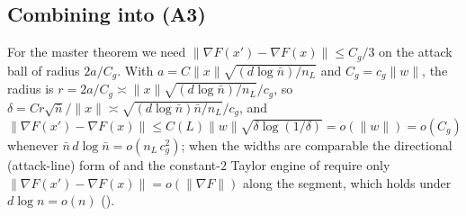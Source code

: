 \subsection{Combining into (A3)}
For the master theorem we need $\|\nabla F(x')-\nabla F(x)\|\le C_g/3$ on the attack ball of radius
$2a/C_g$. With $a=C\|x\|\sqrt{(d\log\bar n)/n_L}$ and $C_g=c_g\|w\|$, the radius is
$r=2a/C_g\asymp\|x\|\sqrt{(d\log\bar n)/n_L}/c_g$, so $\delta=Cr\sqrt{\bar n}/\|x\|\asymp\sqrt{(d\log\bar n)\bar n/n_L}/c_g$,
and $\|\nabla F(x')-\nabla F(x)\|\le C(L)\|w\|\sqrt{\delta\log(1/\delta)}=o(\|w\|)=o(C_g)$ whenever
$\bar n\,d\log\bar n=o(n_L\,c_g^2)$; when the widths are comparable the directional (attack-line) form of
 and the constant-$2$ Taylor engine of \cite[Thm 4.6]{advExt} require only
$\|\nabla F(x')-\nabla F(x)\|=o(\|\nabla F\|)$ along the segment, which holds under $d\log n=o(n)$
().
